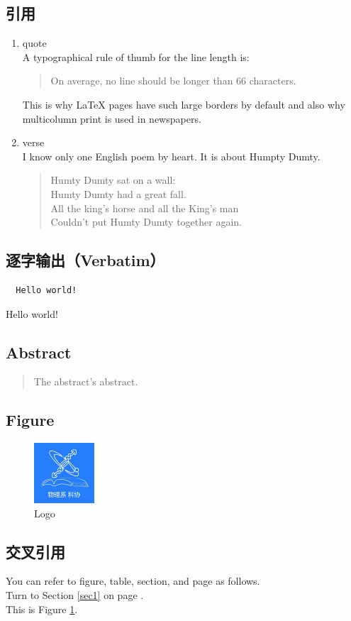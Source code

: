 \documentclass[12pt]{article}
\begin{document}
\subsection{引用}
\begin{enumerate}
	\item quote\\
	A typographical rule of thumb for the line length is:
	\begin{quote}
		On average, no line should be longer than 66 characters.
	\end{quote}
	This is why \LaTeX{} pages have such large borders by default and also why multicolumn print is used in newspapers.
	\item verse\\
	I know only one English poem by heart. It is about Humpty Dumty.
	\begin{flushleft}
		\begin{verse}
			Humty Dumty sat on a wall:\\
			Humty Dumty had a great fall.\\
			All the king's horse and all the King's man\\
			Couldn't put Humty Dumty together again.
		\end{verse}
	\end{flushleft}
\end{enumerate}
\subsection{逐字输出（Verbatim）}
\begin{verbatim}
  Hello world!
\end{verbatim}
Hello world!
\subsection{Abstract}
\begin{abstract}
	The abstract's abstract.\label{abs}
\end{abstract}
\subsection{Figure}
\begin{figure}[!htp]
	\centering
	\includegraphics[width=0.2\textwidth]{logo.jpg}
	\caption{Logo}\label{logo}
\end{figure} %
\subsection{交叉引用}
You can refer to figure, table, section, and page as follows.\\
Turn to Section \ref{sec1} on page \pageref{sec1}.\\
This is Figure \ref{logo}.
\end{document}
